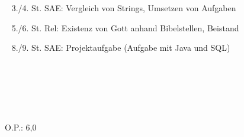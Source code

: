 {{	\textbullet~ 3./4. St. SAE: Vergleich von Strings, Umsetzen von Aufgaben\par
	\textbullet~ 5./6. St. Rel: Existenz von Gott anhand Bibelstellen, Beistand\par
	\textbullet~ 8./9. St. SAE: Projektaufgabe (Aufgabe mit Java und SQL)\par
	\textbullet~ \par
	\textbullet~ \par
	\textbullet~ 
	}{}{O.P.: 6,0}
}{}
\Unterschrift
\newpage
